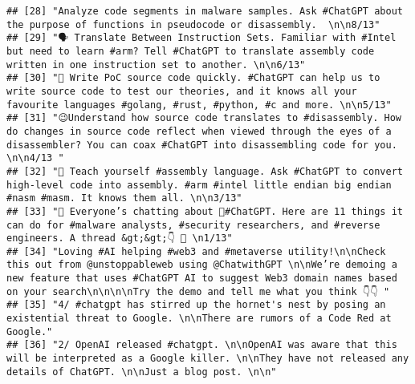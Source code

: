\documentclass[
]{article}
\begin{document}
\begin{verbatim}
## [28] "Analyze code segments in malware samples. Ask #ChatGPT about the purpose of functions in pseudocode or disassembly.  \n\n8/13"                                                                                                                                                                                 
## [29] "🗣️ Translate Between Instruction Sets. Familiar with #Intel but need to learn #arm? Tell #ChatGPT to translate assembly code written in one instruction set to another. \n\n6/13"                                                                                                                               
## [30] "🧪 Write PoC source code quickly. #ChatGPT can help us to write source code to test our theories, and it knows all your favourite languages #golang, #rust, #python, #c and more. \n\n5/13"                                                                                                                    
## [31] "😉Understand how source code translates to #disassembly. How do changes in source code reflect when viewed through the eyes of a disassembler? You can coax #ChatGPT into disassembling code for you.  \n\n4/13 "                                                                                              
## [32] "👾 Teach yourself #assembly language. Ask #ChatGPT to convert high-level code into assembly. #arm #intel little endian big endian #nasm #masm. It knows them all. \n\n3/13"                                                                                                                                    
## [33] "🧵 Everyone’s chatting about 🤖#ChatGPT. Here are 11 things it can do for #malware analysts, #security researchers, and #reverse engineers. A thread &gt;&gt;👇 🧵 \n1/13"                                                                                                                                     
## [34] "Loving #AI helping #web3 and #metaverse utility!\n\nCheck this out from @unstoppableweb using @ChatwithGPT \n\nWe’re demoing a  new feature that uses #ChatGPT AI to suggest Web3 domain names based on your search\n\n\n\nTry the demo and tell me what you think 👇👇 "                                      
## [35] "4/ #chatgpt has stirred up the hornet's nest by posing an existential threat to Google. \n\nThere are rumors of a Code Red at Google."                                                                                                                                                                         
## [36] "2/ OpenAI released #chatgpt. \n\nOpenAI was aware that this will be interpreted as a Google killer. \n\nThey have not released any details of ChatGPT. \n\nJust a blog post. \n\n"                                                                                                                             

\end{verbatim}
\end{document}
